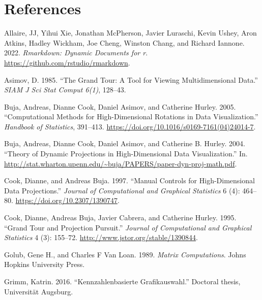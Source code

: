 \hypertarget{references}{%
\section*{References}\label{references}}

\hypertarget{refs}{}
\begin{CSLReferences}{1}{0}
\leavevmode{}%
Allaire, JJ, Yihui Xie, Jonathan McPherson, Javier Luraschi, Kevin Ushey, Aron Atkins, Hadley Wickham, Joe Cheng, Winston Chang, and Richard Iannone. 2022. \emph{Rmarkdown: Dynamic Documents for r}. \url{https://github.com/rstudio/rmarkdown}.

\leavevmode{}%
Asimov, D. 1985. {``The Grand Tour: A Tool for Viewing Multidimensional Data.''} \emph{SIAM J Sci Stat Comput 6(1)}, 128--43.

\leavevmode{}%
Buja, Andreas, Dianne Cook, Daniel Asimov, and Catherine Hurley. 2005. {``Computational Methods for High-Dimensional Rotations in Data Visualization.''} \emph{Handbook of Statistics}, 391--413. \url{https://doi.org/10.1016/s0169-7161(04)24014-7}.

\leavevmode{}%
Buja, Andreas, Dianne Cook, Daniel Asimov, and Catherine B. Hurley. 2004. {``Theory of Dynamic Projections in High-Dimensional Data Visualization.''} In. \url{http://stat.wharton.upenn.edu/~buja/PAPERS/paper-dyn-proj-math.pdf}.

\leavevmode{}%
Cook, Dianne, and Andreas Buja. 1997. {``Manual Controls for High-Dimensional Data Projections.''} \emph{Journal of Computational and Graphical Statistics} 6 (4): 464--80. \url{https://doi.org/10.2307/1390747}.

\leavevmode{}%
Cook, Dianne, Andreas Buja, Javier Cabrera, and Catherine Hurley. 1995. {``Grand Tour and Projection Pursuit.''} \emph{Journal of Computational and Graphical Statistics} 4 (3): 155--72. \url{http://www.jstor.org/stable/1390844}.

\leavevmode{}%
Golub, Gene H., and Charles F Van Loan. 1989. \emph{Matrix Computations}. Johns Hopkins University Press.

\leavevmode{}%
Grimm, Katrin. 2016. {``Kennzahlenbasierte Grafikauswahl.''} Doctoral thesis, Universit{ä}t Augsburg.


\end{CSLReferences}
